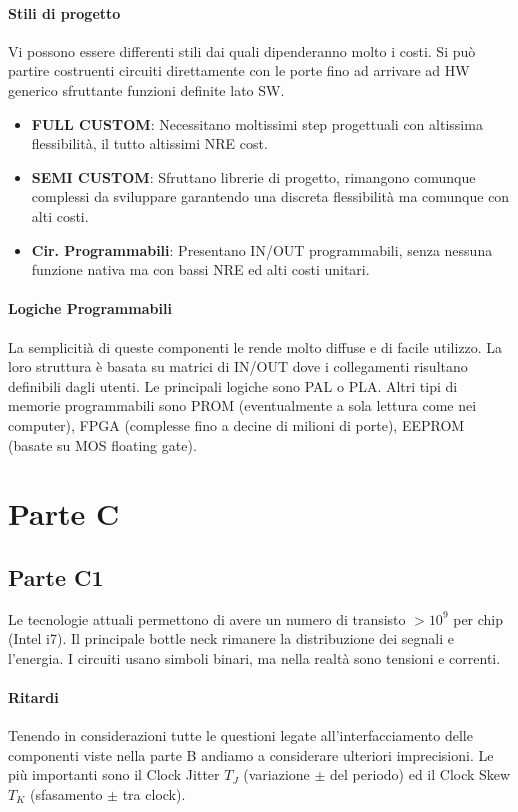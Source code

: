 \documentclass[12pt]{article}
\begin{document}
\paragraph{Stili di progetto} Vi possono essere differenti stili dai quali dipenderanno molto i costi. Si può partire costruenti circuiti direttamente con le porte fino ad arrivare ad HW generico sfruttante funzioni definite lato SW.
\begin{itemize}
  \item \textbf{FULL CUSTOM}: Necessitano moltissimi step progettuali con altissima flessibilità, il tutto altissimi NRE cost.
  \item \textbf{SEMI CUSTOM}: Sfruttano librerie di progetto, rimangono comunque complessi da sviluppare garantendo una discreta flessibilità ma comunque con alti costi.
  \item \textbf{Cir. Programmabili}: Presentano IN/OUT programmabili, senza nessuna funzione nativa ma con bassi NRE ed alti costi unitari.
\end{itemize}

\paragraph{Logiche Programmabili} La semplicitià di queste componenti le rende molto diffuse e di facile utilizzo. La loro struttura è basata su matrici di IN/OUT dove i collegamenti risultano definibili dagli utenti. Le principali logiche sono PAL o PLA. Altri tipi di memorie programmabili sono PROM (eventualmente a sola lettura come nei computer), FPGA (complesse fino a decine di milioni di porte), EEPROM (basate su MOS floating gate).

\section{Parte C}
\subsection{Parte C1}\label{c1}
Le tecnologie attuali permettono di avere un numero di transisto $>10^9$ per chip (Intel i7). Il principale bottle neck rimanere la distribuzione dei segnali e l'energia. I circuiti usano simboli binari, ma nella realtà sono tensioni e correnti.

\paragraph{Ritardi} Tenendo in considerazioni tutte le questioni legate all'interfacciamento delle componenti viste nella parte B andiamo a considerare ulteriori imprecisioni. Le più importanti sono il Clock Jitter $T_{J}$ (variazione $\pm$ del periodo) ed il Clock Skew $T_{K}$ (sfasamento $\pm$ tra clock).
\end{document}

